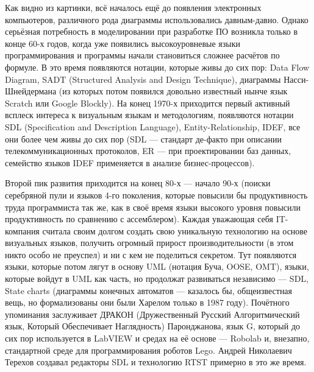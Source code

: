 \documentclass{../text-style}
\begin{document}
Как видно из картинки, всё началось ещё до появления электронных компьютеров, различного рода диаграммы использовались давным-давно. Однако серьёзная потребность в моделировании при разработке ПО возникла только в конце 60-х годов, когда уже появились высокоуровневые языки программирования и программы начали становиться сложнее расчётов по формуле. В это время появляются нотации, которые живы до сих пор: Data Flow Diagram, SADT (Structured Analysis and Design Technique), диаграммы Насси-Шнейдермана (из которых потом появился довольно известный нынче язык Scratch или Google Blockly). На конец 1970-х приходится первый активный всплеск интереса к визуальным языкам и методологиям, появляются нотации SDL (Specification and Description Language), Entity-Relationship, IDEF, все они более чем живы до сих пор (SDL --- стандарт де-факто при описании телекоммуникационных протоколов, ER --- при проектировании баз данных, семейство языков IDEF применяется в анализе бизнес-процессов). 

Второй пик развития приходится на конец 80-х --- начало 90-х (поиски серебряной пули и языков 4-го поколения, которые повысили бы продуктивность труда программиста так же, как в своё время языки высокого уровня повысили продуктивность по сравнению с ассемблером). Каждая уважающая себя IT-компания считала своим долгом создать свою уникальную технологию на основе визуальных языков, получить огромный прирост производительности (в этом никто особо не преуспел) и ни с кем не поделиться секретом. Тут появляются языки, которые потом лягут в основу UML (нотация Буча, OOSE, OMT), языки, которые войдут в UML как часть, но продолжат развиваться независимо --- SDL, State charts (диаграммы конечных автоматов --- казалось бы, общеизвестная вещь, но формализованы они были Харелом только в 1987 году). Почётного упоминания заслуживает ДРАКОН (Дружественный Русский Алгоритмический язык, Который Обеспечивает Наглядность) Паронджанова, язык G, который до сих пор используется в LabVIEW и средах на её основе --- Robolab и, внезапно, стандартной среде для программирования роботов Lego. Андрей Николаевич Терехов создавал редакторы SDL и технологию RTST примерно в это же время.
\end{document}
